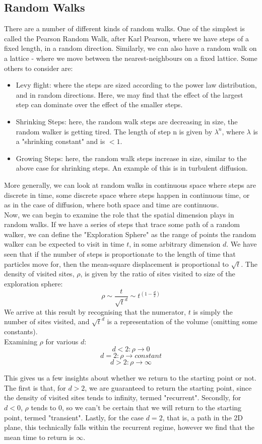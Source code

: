 \documentclass[a4paper, 12pt]{article}
\begin{document}
\subsection*{Random Walks}
	
There are a number of different kinds of random walks. One of the simplest is called the Pearson Random Walk, after Karl Pearson, where we have steps of a fixed length, in a random direction. Similarly, we can also have a random walk on a lattice - where we move between the nearest-neighbours on a fixed lattice.  Some others to consider are:
\begin{itemize}
\item Levy flight: where the steps are sized according to the power law distribution, and in random directions. Here, we may find that the effect of the largest step can dominate over the effect of the smaller steps. 
\item Shrinking Steps: here, the random walk steps are decreasing in size, the random walker is getting tired. The length of step n is given by $\lambda ^n$, where $\lambda$ is a "shrinking constant" and is $<1$. 
\item Growing Steps: here, the random walk steps increase in size, similar to the above case for shrinking steps. An example of this is in turbulent diffusion.
\end{itemize}
More generally, we can look at random walks in continuous space where steps are discrete in time, some discrete space where steps happen in continuous time, or as in the case of diffusion, where both space and time are continuous.\\

Now, we can begin to examine the role that the spatial dimension plays in random walks. If we have a series of steps that trace some path of a random walker, we can define the "Exploration Sphere" as the range of points the random walker can be expected to visit in time $t$, in some arbitrary dimension $d$. We have seen that if the number of steps is proportionate to the length of time that particles move for, then the mean-square displacement is proportional to $\sqrt{t}$. The density of visited sites, $\rho$, is given by the ratio of sites visited to size of the exploration sphere: 
$$ \rho \sim \frac{t}{\sqrt{t}^d} \sim t ^{\left( 1-\frac{d}{2} \right) } $$
We arrive at this result by recognising that the numerator, $t$ is simply the number of sites visited, and $\sqrt{t}^d$ is a representation of the volume (omitting some constants). \\

Examining $\rho$ for various $d$:
$$ d<2: \rho \rightarrow 0 $$
$$ d=2: \rho \rightarrow constant$$
$$ d>2: \rho \rightarrow \infty$$

This gives us a few insights about whether we return to the starting point or not. The first is that, for $d>2$, we are guaranteed to return the starting point, since the density of visited sites tends to infinity, termed "recurrent". Secondly, for $d<0$, $\rho$ tends to $0$, so we can't be certain that we will return to the starting point, termed "transient". Lastly, for the case $d=2$, that is, a path in the 2D plane, this technically falls within the recurrent regime, however we find that the mean time to return is $\infty$.
\end{document}
